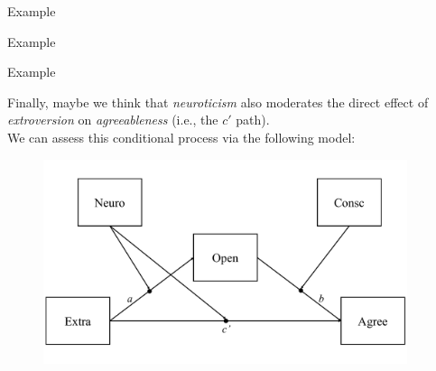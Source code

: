 \documentclass{beamer}
\newcommand{\va}[0]{\vspace{12pt}}
\newcommand{\vb}[0]{\vspace{6pt}}
\begin{document}
\begin{frame}[shrink = 5]{Example}



\end{frame}



\begin{frame}[allowframebreaks]{Example}



\pagebreak



\end{frame}




\begin{frame}{Example}
  
  Finally, maybe we think that \emph{neuroticism} also moderates the
  direct effect of \emph{extroversion} on \emph{agreeableness} (i.e.,
  the $c'$ path).\\ 
  \va 
  We can assess this conditional process via the following model:\\ 
  \vb
  \begin{figure}
    \includegraphics[width=0.95\textwidth]{figures/example4Conceptual.pdf}
  \end{figure}
  
\end{frame}
\end{document}
